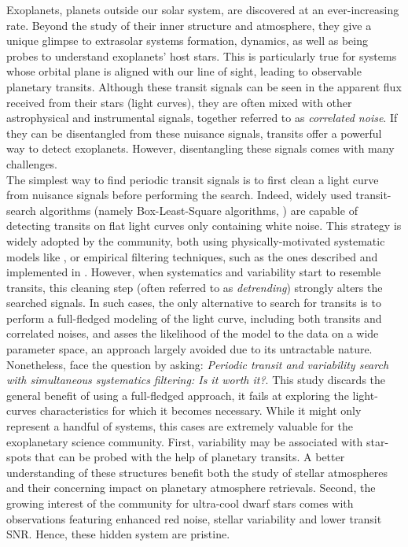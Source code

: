 \documentclass{aastex631}
\begin{document}
Exoplanets, planets outside our solar system, are discovered at an ever-increasing rate. Beyond the study of their inner structure and atmosphere, they give a unique glimpse to extrasolar systems formation, dynamics, as well as being probes to understand exoplanets' host stars. This is particularly true for systems whose orbital plane is aligned with our line of sight, leading to observable planetary transits. Although these transit signals can be seen in the apparent flux received from their stars (light curves), they are often mixed with other astrophysical and instrumental signals, together referred to as \textit{correlated noise}. If they can be disentangled from these nuisance signals, transits offer a powerful way to detect exoplanets. However, disentangling these signals comes with many challenges.
\bigskip\\
The simplest way to find periodic transit signals is to first clean a light curve from nuisance signals before performing the search. Indeed, widely used transit-search algorithms (namely Box-Least-Square algorithms, \cite{}) are capable of detecting transits on flat light curves only containing white noise. This strategy is widely adopted by the community, both using physically-motivated systematic models like \cite{everest1, everest2}, or empirical filtering techniques, such as the ones described and implemented in \cite{wotan}. However, when systematics and variability start to resemble transits, this cleaning step (often referred to as \textit{detrending}) strongly alters the searched signals. In such cases, the only alternative to search for transits is to perform a full-fledged modeling of the light curve, including both transits and correlated noises, and asses the likelihood of the model to the data on a wide parameter space, an approach largely avoided due to its untractable nature. Nonetheless, \citealt{kovacs2016} face the question by asking: \textit{Periodic transit and variability search with simultaneous systematics filtering: Is it worth it?}. This study discards the general benefit of using a full-fledged approach, it fails at exploring the light-curves characteristics for which it becomes necessary. While it might only represent a handful of systems, this cases are extremely valuable for the exoplanetary science community. First, variability may be associated with star-spots that can be probed with the help of planetary transits. A better understanding of these structures benefit both the study of stellar atmospheres and their concerning impact on planetary atmosphere retrievals. Second, the growing interest of the community for ultra-cool dwarf stars comes with observations featuring enhanced red noise, stellar variability and lower transit SNR. Hence, these hidden system are pristine.
\end{document}
